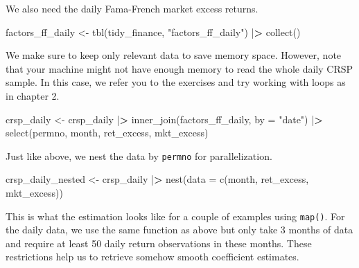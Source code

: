 \documentclass[
]{book}
\newenvironment{Shaded}{\begin{snugshade}}{\end{snugshade}}
\newcommand{\AttributeTok}[1]{\textcolor[rgb]{0.61,0.61,0.61}{#1}}
\newcommand{\ErrorTok}[1]{\textcolor[rgb]{0.14,0.14,0.14}{\textbf{#1}}}
\newcommand{\FunctionTok}[1]{\textcolor[rgb]{0,0,0}{#1}}
\newcommand{\NormalTok}[1]{#1}
\newcommand{\OtherTok}[1]{\textcolor[rgb]{0.37,0.37,0.37}{#1}}
\newcommand{\SpecialCharTok}[1]{\textcolor[rgb]{0,0,0}{#1}}
\newcommand{\StringTok}[1]{\textcolor[rgb]{0.5,0.5,0.5}{#1}}
\begin{document}
We also need the daily Fama-French market excess returns.

\begin{Shaded}
\begin{Highlighting}[]
\NormalTok{factors\_ff\_daily }\OtherTok{\textless{}{-}} \FunctionTok{tbl}\NormalTok{(tidy\_finance, }\StringTok{"factors\_ff\_daily"}\NormalTok{) }\SpecialCharTok{|}\ErrorTok{\textgreater{}}
  \FunctionTok{collect}\NormalTok{()}
\end{Highlighting}
\end{Shaded}

We make sure to keep only relevant data to save memory space.
However, note that your machine might not have enough memory to read the whole daily CRSP sample. In this case, we refer you to the exercises and try working with loops as in chapter 2.

\begin{Shaded}
\begin{Highlighting}[]
\NormalTok{crsp\_daily }\OtherTok{\textless{}{-}}\NormalTok{ crsp\_daily }\SpecialCharTok{|}\ErrorTok{\textgreater{}}
  \FunctionTok{inner\_join}\NormalTok{(factors\_ff\_daily, }\AttributeTok{by =} \StringTok{"date"}\NormalTok{) }\SpecialCharTok{|}\ErrorTok{\textgreater{}}
  \FunctionTok{select}\NormalTok{(permno, month, ret\_excess, mkt\_excess)}
\end{Highlighting}
\end{Shaded}

Just like above, we nest the data by \texttt{permno} for parallelization.

\begin{Shaded}
\begin{Highlighting}[]
\NormalTok{crsp\_daily\_nested }\OtherTok{\textless{}{-}}\NormalTok{ crsp\_daily }\SpecialCharTok{|}\ErrorTok{\textgreater{}}
  \FunctionTok{nest}\NormalTok{(}\AttributeTok{data =} \FunctionTok{c}\NormalTok{(month, ret\_excess, mkt\_excess))}
\end{Highlighting}
\end{Shaded}

This is what the estimation looks like for a couple of examples using \texttt{map()}.
For the daily data, we use the same function as above but only take 3 months of data and require at least 50 daily return observations in these months.
These restrictions help us to retrieve somehow smooth coefficient estimates.
\end{document}
